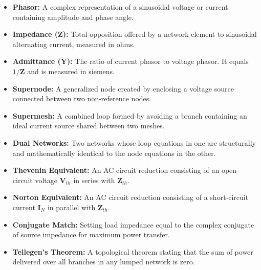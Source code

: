 \documentclass[12pt,a4paper]{article}
\begin{document}
\begin{tcolorbox}[defbox, title={\textbf{One-Line Definitions}}]
\begin{itemize}[leftmargin=*, itemsep=2pt, topsep=0pt]
  \item \textbf{Phasor:} A complex representation of a sinusoidal voltage or current containing amplitude and phase angle.
  \item \textbf{Impedance ($\mathbf{Z}$):} Total opposition offered by a network element to sinusoidal alternating current, measured in ohms.
  \item \textbf{Admittance ($\mathbf{Y}$):} The ratio of current phasor to voltage phasor. It equals $1/\mathbf{Z}$ and is measured in siemens.
  \item \textbf{Supernode:} A generalized node created by enclosing a voltage source connected between two non-reference nodes.
  \item \textbf{Supermesh:} A combined loop formed by avoiding a branch containing an ideal current source shared between two meshes.
  \item \textbf{Dual Networks:} Two networks whose loop equations in one are structurally and mathematically identical to the node equations in the other.
  \item \textbf{Thevenin Equivalent:} An AC circuit reduction consisting of an open-circuit voltage $\mathbf{V}_{th}$ in series with $\mathbf{Z}_{th}$.
  \item \textbf{Norton Equivalent:} An AC circuit reduction consisting of a short-circuit current $\mathbf{I}_N$ in parallel with $\mathbf{Z}_{th}$.
  \item \textbf{Conjugate Match:} Setting load impedance equal to the complex conjugate of source impedance for maximum power transfer.
  \item \textbf{Tellegen's Theorem:} A topological theorem stating that the sum of power delivered over all branches in any lumped network is zero.
\end{itemize}
\end{tcolorbox}
\end{document}
